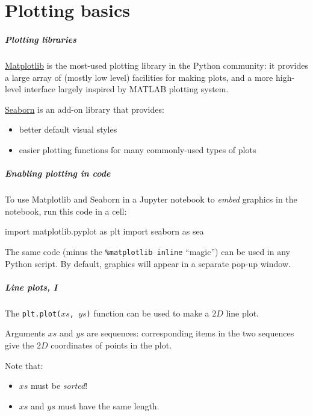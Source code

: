 \documentclass[english,serif,mathserif,xcolor=pdftex,dvipsnames,table]{beamer}
\begin{document}
\part{Plotting basics}


\begin{frame}
  \frametitle{Plotting libraries}

  \href{http://matplotlib.org/gallery.html}{Matplotlib} is the most-used
plotting library in the Python community: it provides a large array of
(mostly low level) facilities for making plots, and a more high-level
interface largely inspired by MATLAB plotting system.

\href{http://seaborn.pydata.org/index.html}{Seaborn} is an add-on
library that provides:

\begin{itemize}
\item
  better default visual styles
\item
  easier plotting functions for many commonly-used types of plots
\end{itemize}

\end{frame}

\begin{frame}[fragile]
  \frametitle{Enabling plotting in code}

  To use Matplotlib and Seaborn in a Jupyter notebook to \emph{embed} graphics
  in the notebook, run this code in a cell:
  \begin{python}

import matplotlib.pyplot as plt
import seaborn as sea
  \end{python}

  \+ The same code (minus the \texttt{\%matplotlib inline} ``magic'') can be
  used in any Python script.  By default, graphics will appear in a separate
  pop-up window.
\end{frame}


\begin{frame}
  \frametitle{Line plots, I}
  The \texttt{plt.plot($xs$, $ys$)} function can be used to make a $2D$ line plot.

  \+
  Arguments \texttt{$xs$} and \texttt{$ys$} are sequences: corresponding items in
  the two sequences give the $2D$ coordinates of points in the plot.

  \+
  Note that:
  \begin{itemize}
  \item \texttt{$xs$} must be \emph{sorted}!
  \item \texttt{$xs$} and \texttt{$ys$} must have the same length.
  \end{itemize}
\end{frame}
\end{document}
